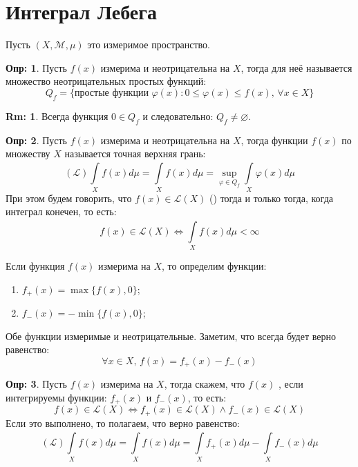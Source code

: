 \documentclass[12pt]{article}
\newcommand{\ML}{\mathcal{L}}
\newcommand{\MM}{\mathcal{M}}
\newcommand{\VN}{\varnothing}
\theoremstyle{definition}
\newtheorem{defn}{Опр:}
\newtheorem{rem}{Rm:}
\newcommand{\ddint}[2]{\displaystyle\int\limits_{#1}^{#2}}
\begin{document}

\section*{Интеграл Лебега}


Пусть $(X, \MM,\mu)$ это измеримое пространство.

\begin{defn}
	Пусть $f(x)$ измерима и неотрицательна на $X$, тогда  для неё называется множество неотрицательных простых функций: 
	$$
		Q_f = \{\text{простые функции } \varphi(x) \colon 0 \leq \varphi(x) \leq f(x), \, \forall x \in X\}
	$$
\end{defn}

\begin{rem}
	Всегда функция $0 \in Q_f$ и следовательно: $Q_f  \neq \VN$.
\end{rem}

\begin{defn}
	Пусть $f(x)$ измерима и неотрицательна на $X$, тогда  функции $f(x)$ по множеству $X$ называется точная верхняя грань:
	$$
		(\ML) \ddint{X}{}f(x)d\mu = \ddint{X}{}f(x) d\mu = \sup\limits_{\varphi \in Q_f} \ddint{X}{}\varphi(x) d\mu
	$$
	При этом будем говорить, что $f(x) \in \ML(X)$ () тогда и только тогда, когда интеграл конечен, то есть:
	$$
		f(x) \in \ML(X) \Leftrightarrow \ddint{X}{}f(x)d\mu < \infty
	$$
\end{defn}

Если функция $f(x)$ измерима на $X$, то определим функции:
\begin{enumerate}[label=\arabic*)]
	\item $f_{+}(x) = \max\{f(x), 0\}$;
	\item $f_{-}(x) = - \min\{f(x),0\}$;
\end{enumerate}
Обе функции измеримые и неотрицательные. Заметим, что всегда будет верно равенство:
$$
	\forall x \in X, \, f(x) = f_{+}(x) - f_{-}(x)
$$
\begin{defn}
	Пусть $f(x)$ измерима на $X$, тогда скажем, что $f(x)$ , если интегрируемы функции: $f_{+}(x)$ и $f_{-}(x)$, то есть: 
	$$
		f(x) \in \ML(X) \Leftrightarrow f_{+}(x) \in \ML(X) \wedge f_{-}(x) \in \ML(X)
	$$
	Если это выполнено, то полагаем, что верно равенство:
	$$
		(\ML) \ddint{X}{}f(x)d\mu  = \ddint{X}{}f(x)d\mu = \ddint{X}{}f_{+}(x) d\mu - \ddint{X}{}f_{-}(x)d\mu
	$$
\end{defn}
\end{document}
